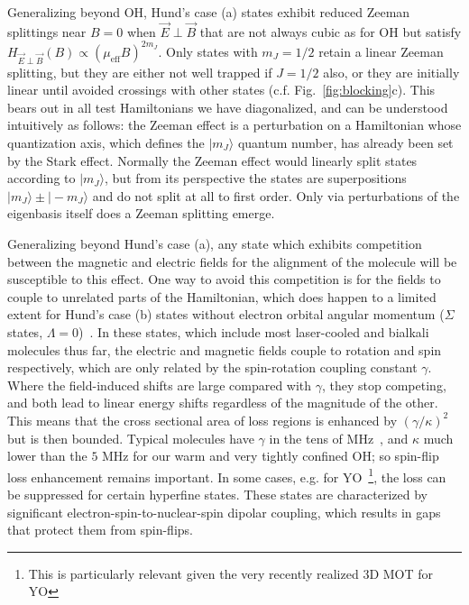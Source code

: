 \documentclass[%
 reprint,
 amsmath,amssymb,
 aps,
prl,
]{revtex4-1}
\newcommand{\epb}{{$\vec{E}\!\perp\!\vec{B}$}}
\newcommand{\epbm}{{\vec{E}\!\perp\!\vec{B}}}
\begin{document}
Generalizing beyond OH, Hund's case (a) states exhibit reduced Zeeman splittings near $B\!=\!0$ when \epb{} that are not always cubic as for OH but satisfy $H_\epbm(B)\propto (\mu_\text{eff}B)^{2m_J}$. 
Only states with $m_J=1/2$ retain a linear Zeeman splitting, but they are either not well trapped if $J=1/2$ also, or they are initially linear until avoided crossings with other states (c.f. Fig.~\ref{fig:blocking}c). 
This bears out in all test Hamiltonians we have diagonalized, and can be understood intuitively as follows: the Zeeman effect is a perturbation on a Hamiltonian whose quantization axis, which defines the $|m_J\rangle$ quantum number, has already been set by the Stark effect. 
Normally the Zeeman effect would linearly split states according to $|m_J\rangle$, but from its perspective the states are superpositions $|m_J\rangle\pm|\!-\!m_J\rangle$ and do not split at all to first order. 
Only via perturbations of the eigenbasis itself does a Zeeman splitting emerge.

Generalizing beyond Hund's case (a), any state which exhibits competition between the magnetic and electric fields for the alignment of the molecule will be susceptible to this effect. 
One way to avoid this competition is for the fields to couple to unrelated parts of the Hamiltonian, which does happen to a limited extent for Hund's case (b) states without electron orbital angular momentum ($\Sigma$ states, $\Lambda=0$)~\cite{Bohn2013}. 
In these states, which include most laser-cooled and bialkali molecules thus far, the electric and magnetic fields couple to rotation and spin respectively, which are only related by the spin-rotation coupling constant $\gamma$. 
Where the field-induced shifts are large compared with $\gamma$, they stop competing, and both lead to linear energy shifts regardless of the magnitude of the other. 
This means that the cross sectional area of loss regions is enhanced by $(\gamma/\kappa)^2$ but is then bounded. 
Typical molecules have $\gamma$ in the tens of MHz~\cite{Quemener2016}, and $\kappa$ much lower than the $5\text{ MHz}$ for our warm and very tightly confined OH; so spin-flip loss enhancement remains important. 
In some cases, e.g. for YO~\footnote{This is particularly relevant given the very recently realized 3D MOT for YO}, the loss can be suppressed for certain hyperfine states. 
These states are characterized by significant  electron-spin-to-nuclear-spin dipolar coupling, which results in gaps that protect them from spin-flips.


\end{document}
